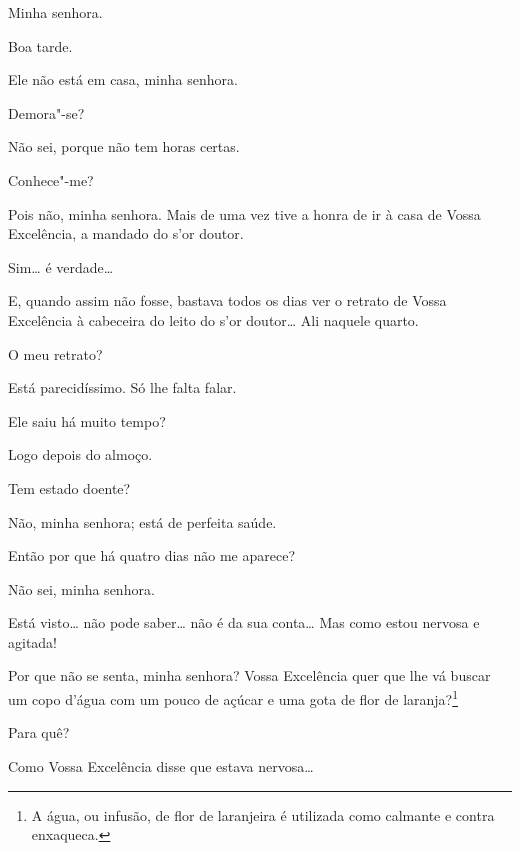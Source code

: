 
  Minha
senhora.

  Boa tarde. 

  Ele não está em casa, minha senhora.

  Demora"-se?

  Não sei, porque não tem horas certas.

  Conhece"-me?

  Pois não, minha senhora. Mais de uma vez tive a honra de
ir à casa de Vossa Excelência, a mandado do s'or
doutor.

  Sim\ldots{} é verdade\ldots{}

  E, quando assim não fosse, bastava todos os dias ver o
retrato de Vossa Excelência à cabeceira do leito do
s'or doutor\ldots{}  Ali naquele quarto.

  O meu retrato?

  Está parecidíssimo. Só lhe falta falar.

  Ele saiu há muito tempo?

  Logo depois do almoço.

  Tem estado doente?

  Não, minha senhora; está de perfeita saúde.

   Então por que há quatro
dias não me aparece?

  Não sei, minha senhora.

  Está visto\ldots{} não pode saber\ldots{} não é da sua conta\ldots{} Mas como
estou nervosa e agitada!

  Por que
não se senta, minha senhora?  Vossa
Excelência quer que lhe vá buscar um copo d'água com
um pouco de açúcar e uma gota de flor de laranja?\footnote{
A água, ou infusão, de flor de laranjeira é utilizada como calmante e contra enxaqueca.}

  Para quê?

  Como Vossa Excelência disse que estava nervosa\ldots{}

